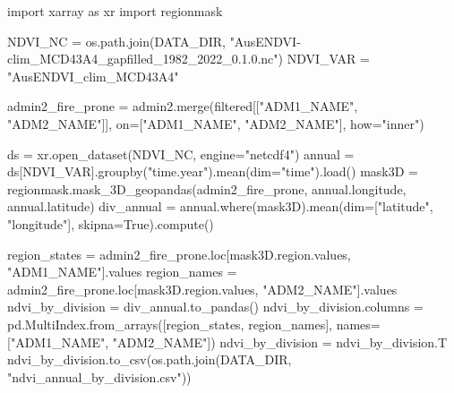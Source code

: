 \documentclass[
  letterpaper,
  DIV=11,
  numbers=noendperiod]{scrartcl}
\newenvironment{Shaded}{\begin{snugshade}}{\end{snugshade}}
\newcommand{\ImportTok}[1]{\textcolor[rgb]{0.00,0.46,0.62}{#1}}
\newcommand{\NormalTok}[1]{\textcolor[rgb]{0.00,0.23,0.31}{#1}}
\newcommand{\OperatorTok}[1]{\textcolor[rgb]{0.37,0.37,0.37}{#1}}
\newcommand{\StringTok}[1]{\textcolor[rgb]{0.13,0.47,0.30}{#1}}
\newcommand{\VariableTok}[1]{\textcolor[rgb]{0.07,0.07,0.07}{#1}}
\begin{document}
\begin{Shaded}
\begin{Highlighting}[]
\ImportTok{import}\NormalTok{ xarray }\ImportTok{as}\NormalTok{ xr}
\ImportTok{import}\NormalTok{ regionmask}

\NormalTok{NDVI\_NC }\OperatorTok{=}\NormalTok{ os.path.join(DATA\_DIR, }\StringTok{"AusENDVI{-}clim\_MCD43A4\_gapfilled\_1982\_2022\_0.1.0.nc"}\NormalTok{)}
\NormalTok{NDVI\_VAR }\OperatorTok{=} \StringTok{"AusENDVI\_clim\_MCD43A4"}

\NormalTok{admin2\_fire\_prone }\OperatorTok{=}\NormalTok{ admin2.merge(filtered[[}\StringTok{"ADM1\_NAME"}\NormalTok{, }\StringTok{"ADM2\_NAME"}\NormalTok{]], on}\OperatorTok{=}\NormalTok{[}\StringTok{"ADM1\_NAME"}\NormalTok{, }\StringTok{"ADM2\_NAME"}\NormalTok{], how}\OperatorTok{=}\StringTok{"inner"}\NormalTok{)}

\NormalTok{ds }\OperatorTok{=}\NormalTok{ xr.open\_dataset(NDVI\_NC, engine}\OperatorTok{=}\StringTok{"netcdf4"}\NormalTok{)}
\NormalTok{annual }\OperatorTok{=}\NormalTok{ ds[NDVI\_VAR].groupby(}\StringTok{"time.year"}\NormalTok{).mean(dim}\OperatorTok{=}\StringTok{"time"}\NormalTok{).load()}
\NormalTok{mask3D }\OperatorTok{=}\NormalTok{ regionmask.mask\_3D\_geopandas(admin2\_fire\_prone, annual.longitude, annual.latitude)}
\NormalTok{div\_annual }\OperatorTok{=}\NormalTok{ annual.where(mask3D).mean(dim}\OperatorTok{=}\NormalTok{[}\StringTok{"latitude"}\NormalTok{, }\StringTok{"longitude"}\NormalTok{], skipna}\OperatorTok{=}\VariableTok{True}\NormalTok{).compute()}

\NormalTok{region\_states }\OperatorTok{=}\NormalTok{ admin2\_fire\_prone.loc[mask3D.region.values, }\StringTok{"ADM1\_NAME"}\NormalTok{].values}
\NormalTok{region\_names }\OperatorTok{=}\NormalTok{ admin2\_fire\_prone.loc[mask3D.region.values, }\StringTok{"ADM2\_NAME"}\NormalTok{].values}
\NormalTok{ndvi\_by\_division }\OperatorTok{=}\NormalTok{ div\_annual.to\_pandas()}
\NormalTok{ndvi\_by\_division.columns }\OperatorTok{=}\NormalTok{ pd.MultiIndex.from\_arrays([region\_states, region\_names], names}\OperatorTok{=}\NormalTok{[}\StringTok{"ADM1\_NAME"}\NormalTok{, }\StringTok{"ADM2\_NAME"}\NormalTok{])}
\NormalTok{ndvi\_by\_division }\OperatorTok{=}\NormalTok{ ndvi\_by\_division.T}
\NormalTok{ndvi\_by\_division.to\_csv(os.path.join(DATA\_DIR, }\StringTok{"ndvi\_annual\_by\_division.csv"}\NormalTok{))}
\end{Highlighting}
\end{Shaded}
\end{document}
